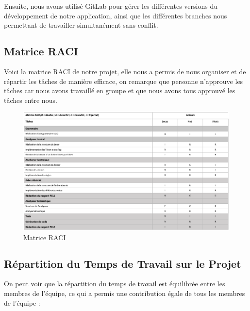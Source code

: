 \documentclass[french,a4paper]{article}
\begin{document}
    Ensuite, nous avons utilisé GitLab pour gérer les différentes versions du développement de notre application, ainsi que les différentes
    branches nous permettant de travailler simultanément sans conflit.

    \subsection{Matrice RACI}\label{subsec:matrice-raci}
    Voici la matrice RACI de notre projet, elle nous a permis de nous organiser et de répartir les tâches de manière efficace, on remarque que personne n'approuve les tâches car nous avons travaillé en groupe et que nous avons tous approuvé les tâches entre nous.

    \begin{figure}[H]
        \centering
        \includegraphics[width=1\textwidth]{RACI}
        \caption{Matrice RACI}\label{fig:figure3}
    \end{figure}

    \subsection{Répartition du Temps de Travail sur le Projet}\label{subsec:repartition-du-temps-de-travail-sur-le-projet}

    On peut voir que la répartition du temps de travail est équilibrée entre les membres de l'équipe, ce qui a permis une contribution égale de tous les membres de l'équipe :
    \newline
\end{document}

